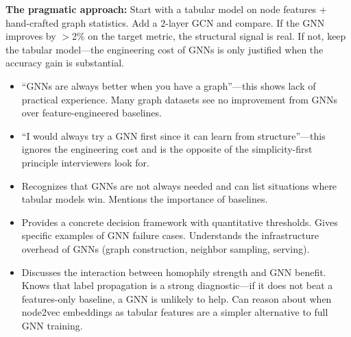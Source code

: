 \begin{interviewq}
\textbf{The pragmatic approach:} Start with a tabular model on node features + hand-crafted graph statistics. Add a 2-layer GCN and compare. If the GNN improves by $>$2\% on the target metric, the structural signal is real. If not, keep the tabular model---the engineering cost of GNNs is only justified when the accuracy gain is substantial.

\redflags
\begin{itemize}
    \item ``GNNs are always better when you have a graph''---this shows lack of practical experience. Many graph datasets see no improvement from GNNs over feature-engineered baselines.
    \item ``I would always try a GNN first since it can learn from structure''---this ignores the engineering cost and is the opposite of the simplicity-first principle interviewers look for.
\end{itemize}


\goodgreat
\begin{itemize}
    \item {} Recognizes that GNNs are not always needed and can list situations where tabular models win. Mentions the importance of baselines.
    \item {} Provides a concrete decision framework with quantitative thresholds. Gives specific examples of GNN failure cases. Understands the infrastructure overhead of GNNs (graph construction, neighbor sampling, serving).
    \item {} Discusses the interaction between homophily strength and GNN benefit. Knows that label propagation is a strong diagnostic---if it does not beat a features-only baseline, a GNN is unlikely to help. Can reason about when node2vec embeddings as tabular features are a simpler alternative to full GNN training.
\end{itemize}

\end{interviewq}

